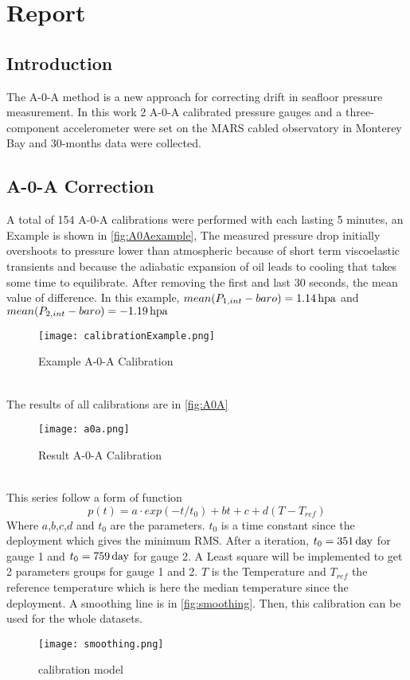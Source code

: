 \chapter{Report}
\section{Introduction}
The A-0-A method is a new approach for correcting drift in seafloor pressure measurement. In this work 2 A-0-A calibrated pressure gauges and a three-component accelerometer were set on the MARS cabled observatory in Monterey Bay and 30-months data were collected.


\section{A-0-A Correction}
A total of 154 A-0-A calibrations were performed with each lasting 5 minutes, an Example is shown in \autoref{fig:A0Aexample}, The measured pressure drop initially overshoots to pressure lower than atmospheric because of short term viscoelastic transients and because the adiabatic expansion of oil leads to cooling that takes some time to equilibrate. After removing the first and last 30 seconds, the mean value of difference. In this example, $mean(P_{1,int} - baro) = 1.14 \,\mathrm{hpa}$ and $mean(P_{2,int} - baro) = -1.19 \,\mathrm{hpa}$  
\begin{figure}[htpb]\centering
	\texttt{[image: calibrationExample.png]}
	\caption{Example A-0-A Calibration}
	\label{fig:A0Aexample}
\end{figure}\\
The results of all calibrations are in \autoref{fig:A0A}
\begin{figure}[htpb]\centering
	\texttt{[image: a0a.png]}
	\caption{Result A-0-A Calibration}
	\label{fig:A0A}
\end{figure}\\
This series follow a form of function
\begin{equation}
	p(t) = a \cdot exp(-t/t_0) + bt + c + d(T-T_{ref})
\end{equation}
Where $a$,$b$,$c$,$d$ and $t_0$ are the parameters. $t_0$ is a time constant since the deployment which gives the minimum RMS. After a iteration, $t_0 = 351 \,\mathrm{day}$ for gauge 1 and $t_0 = 759 \,\mathrm{day}$ for gauge 2. A Least square will be implemented to get 2 parameters groups for gauge 1 and 2. $T$ is the Temperature and $T_{ref}$ the reference temperature which is here the median temperature since the deployment. A smoothing line is in \autoref{fig:smoothing}. Then, this calibration can be used for the whole datasets. 
\begin{figure}[htpb]\centering
	\texttt{[image: smoothing.png]}
	\caption{calibration model}
	\label{fig:smoothing}
\end{figure}


